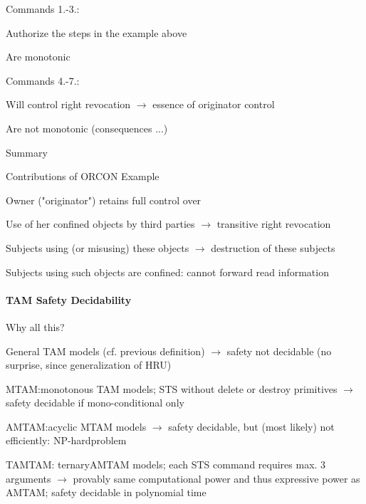 \documentclass[a4paper]{article}
\begin{document}
\begin{multicols}{3}
    \begin{itemize*}
        \item Commands 1.-3.:
              \begin{itemize*}
                  \item Authorize the steps in the example above
                  \item Are monotonic
              \end{itemize*}
        \item Commands 4.-7.:
              \begin{itemize*}
                  \item Will control right revocation $\rightarrow$  essence of originator control
                  \item Are not monotonic (consequences ...)
              \end{itemize*}
        \item Summary
              \begin{itemize*}
                  \item Contributions of ORCON Example
                  \item Owner ("originator") retains full control over
                  \item Use of her confined objects by third parties $\rightarrow$ transitive right revocation
                  \item Subjects using (or misusing) these objects $\rightarrow$ destruction of these subjects
                  \item Subjects using such objects are confined: cannot forward read information
              \end{itemize*}
    \end{itemize*}

    \paragraph{TAM Safety Decidability}
    Why all this?
    \begin{itemize*}
        \item General TAM models (cf. previous definition) $\rightarrow$  safety not decidable (no surprise, since generalization of HRU)
        \item MTAM:monotonous TAM models; STS without delete or destroy primitives $\rightarrow$  safety decidable if mono-conditional only
        \item AMTAM:acyclic MTAM models $\rightarrow$ safety decidable, but (most likely) not efficiently: NP-hardproblem
        \item TAMTAM: ternaryAMTAM models; each STS command requires max. 3 arguments $\rightarrow$  provably same computational power and thus expressive power as AMTAM; safety decidable in polynomial time
    \end{itemize*}


\end{multicols}
\end{document}
